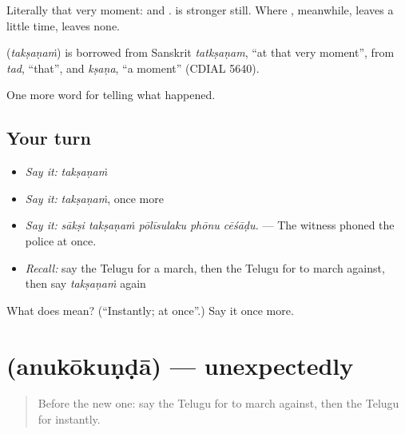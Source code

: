 Literally that very moment:  and .  is stronger still. Where , meanwhile, leaves a little time,  leaves none.

\begin{cousinweb}
\textbf{} (\emph{takṣaṇaṁ}) is borrowed from Sanskrit \emph{tatkṣaṇam}, \textquotedblleft{}at that very moment\textquotedblright{}, from \emph{tad}, \textquotedblleft{}that\textquotedblright{}, and \emph{kṣaṇa}, \textquotedblleft{}a moment\textquotedblright{} (CDIAL 5640).
\end{cousinweb}

\begin{grammarlens}[title={What you've built}]
One more word for telling what happened.
\end{grammarlens}

\subsection*{Your turn}
\begin{itemize}
\raggedright
  \item \emph{Say it:} \emph{takṣaṇaṁ}
  \item \emph{Say it:} \emph{takṣaṇaṁ}, once more
  \item \emph{Say it:} \emph{sākṣi takṣaṇaṁ pōlīsulaku phōnu cēśāḍu.} — The witness phoned the police at once.
  \item \emph{Recall:} say the Telugu for a march, then the Telugu for to march against, then say \emph{takṣaṇaṁ} again
\end{itemize}

\begin{tcolorbox}[breakable,colback=teal!4,colframe=teal!35!black,title={Before you move on}]
What does  mean? (\textquotedblleft{}Instantly; at once\textquotedblright{}.) Say it once more.
\end{tcolorbox}
\section[\texorpdfstring{\te{అనుకోకుండా} (anukōkuṇḍā)}{అనుకోకుండా (anukōkuṇḍā)}]{ (anukōkuṇḍā) — unexpectedly}

\label{lesson:TE-C340-anukokunda}



\begin{quote}
Before the new one: say the Telugu for to march against, then the Telugu for instantly.
\end{quote}

